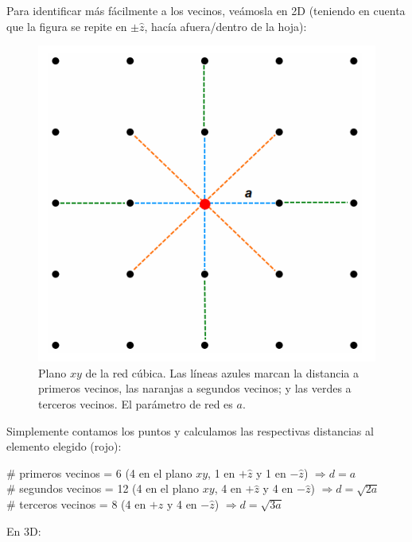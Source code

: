 \documentclass[a4paper]{article}
\begin{document}
Para identificar m\'as f\'acilmente a los vecinos, ve\'amosla en 2D (teniendo en cuenta que la figura se repite en $\pm \hat{z}$, hac\'ia afuera/dentro de la hoja):

\begin{figure}[H]
  \centering
  \includegraphics[width=0.5\linewidth,height=0.5\linewidth]{red2d_sc.png}
  \caption{Plano $xy$ de la red c\'ubica. Las l\'ineas azules marcan la distancia a primeros vecinos, las naranjas a segundos vecinos; y las verdes a terceros vecinos. El par\'ametro de red es $a$.}
  \label{fig:red2d_sc}
\end{figure}
 
Simplemente contamos los puntos y calculamos las respectivas distancias al elemento elegido (rojo):

\begin{center}
\# primeros vecinos = 6 (4 en el plano $xy$, 1 en $+\hat{z}$ y 1 en $-\hat{z}$) $\Rightarrow d = a$ \\
\# segundos vecinos = 12 (4 en el plano $xy$, 4 en $+\hat{z}$ y 4 en $-\hat{z}$) $\Rightarrow d = \sqrt{2a}$ \\
\# terceros vecinos = 8 (4 en $+\hat{z}$ y 4 en $-\hat{z}$) $\Rightarrow d = \sqrt{3a}$ \\
\end{center}

En 3D:
\end{document}
